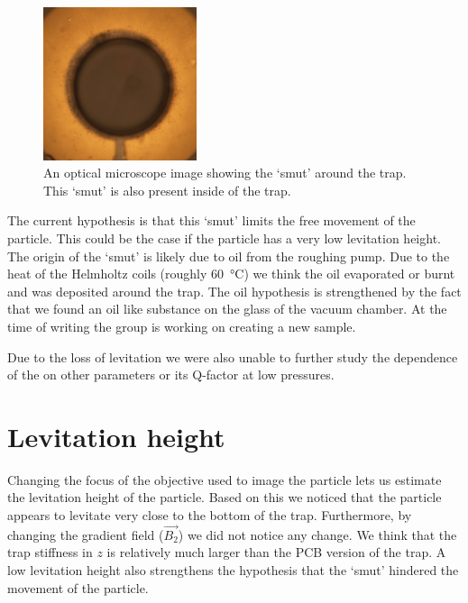 \begin{figure}
    \centering
    \includegraphics[width=0.4\textwidth]{figures/sample/dirt_optical_microscope.jpeg}
    \caption{An optical microscope image showing the `smut' around the trap. This `smut' is also present inside of the trap.}
    \label{fig:smut-optical-microscope}
\end{figure}

The current hypothesis is that this `smut' limits the free movement of the particle. This could be the case if the particle has a very low levitation height. The origin of the `smut' is likely due to oil from the roughing pump. Due to the heat of the Helmholtz coils (roughly \qty{60}{\celsius}) we think the oil evaporated or burnt and was deposited around the trap. The oil hypothesis is strengthened by the fact that we found an oil like substance on the glass of the vacuum chamber. At the time of writing the group is working on creating a new sample.

Due to the loss of levitation we were also unable to further study the dependence of the \zmode on other parameters or its Q-factor at low pressures.

\section*{Levitation height}
Changing the focus of the objective used to image the particle lets us estimate the levitation height of the particle. Based on this we noticed that the particle appears to levitate very close to the bottom of the trap. Furthermore, by changing the gradient field ($\vec{B_2}$) we did not notice any change. We think that the trap stiffness in $z$ is relatively much larger than the PCB version of the trap. A low levitation height also strengthens the hypothesis that the `smut' hindered the movement of the particle.
